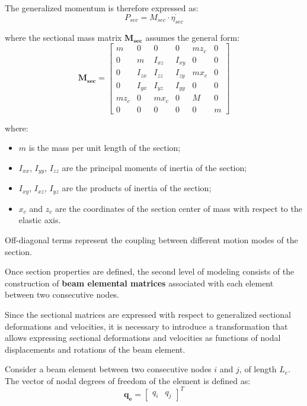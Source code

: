 The generalized momentum is therefore expressed as:
\begin{equation}
    P_{sec} = M_{sec} \cdot \dot{{\eta}_{sec}}
    \label{eq:sectional_stiffness}
\end{equation}

where the sectional mass matrix $\mathbf{M_{sec}}$ assumes the general form:
\begin{equation}
    \mathbf{M_{sec}} =
    \begin{bmatrix}
    m      & 0      & 0         & 0         & mz_c  & 0 \\
    0      & m      & I_{xz}    & I_{xy}    & 0     & 0 \\
    0      & I_{zx} & I_{zz}    & I_{zy}    & mx_c  & 0 \\
    0      & I_{yx} & I_{yz}    & I_{yy}    & 0     & 0 \\
    mz_c   & 0      & mx_c      & 0         & M     & 0 \\
    0      & 0      & 0         & 0         & 0     & m
    \end{bmatrix}
    \label{eq:section_mass_matrix}
\end{equation}

where:
\begin{itemize}
    \item $m$ is the mass per unit length of the section;
    \item $I_{xx}$, $I_{yy}$, $I_{zz}$ are the principal moments of inertia of the section;
    \item $I_{xy}$, $I_{xz}$, $I_{yz}$ are the products of inertia of the section;
    \item $x_c$ and $z_c$ are the coordinates of the section center of mass with respect to the elastic axis.
\end{itemize}
Off-diagonal terms represent the coupling between different motion modes of the section.

Once section properties are defined, the second level of modeling consists of the construction of \textbf{beam elemental matrices} associated with each element
between two consecutive nodes.

Since the sectional matrices are expressed with respect to generalized sectional deformations and velocities,
it is necessary to introduce a transformation that allows expressing sectional deformations and velocities as functions of nodal displacements and rotations
of the beam element.

Consider a beam element between two consecutive nodes $i$ and $j$, of length $L_e$. The vector of nodal degrees of freedom of the element is defined as:
\begin{equation}
    \mathbf{q_e} =
    \begin{bmatrix}
        q_i & q_j
    \end{bmatrix}^T
    \label{eq:elemental_dofs}
\end{equation}

